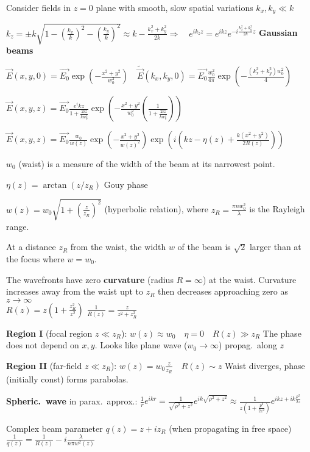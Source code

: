 \begin{squishlist}
    \item Consider fields in $z=0$ plane with smooth, slow spatial variations $k_x, k_y \ll k$
    \item $k_z = \pm k \sqrt{1 - \left(\frac{k_x}{k}\right)^2 - \left(\frac{k_y}{k}\right)^2}\approx k - \tfrac{k_x^2 + k_y^2}{2k} \Rightarrow \quad e^{ik_z z} = e^{ikz}e^{-i \tfrac{k_x^2 + k_y^2}{2k}z}$ \textbf{Gaussian beams}
    \item $\vec{E}(x,y,0) = \vec{E_0} \exp\left({-\tfrac{x^2 + y^2}{w_0^2}}\right) \quad \tilde{\vec{E}}(k_x,k_y,0) = \vec{E_0} \frac{w_0^2}{4\pi} \exp \left(- \frac{(k_x^2 + k_y^2)w_0^2}{4}\right)$
    \item $\vec{E}(x,y,z) = \vec{E_0} \frac{e^ikz}{1 + \tfrac{2iz}{kw_0^2}} \exp\left({-\tfrac{x^2 + y^2}{w_0^2}\left(\tfrac{1}{1 + \tfrac{2iz}{kw_0^2}}\right)}\right)$
    \item $\vec{E}(x,y,z) = \vec{E_0} \frac{w_0}{w(z)}\exp\left(-\frac{x^2 + y^2}{w(z)^2}\right) \exp \left(i \left(kz - \eta(z) + \frac{k(x^2 + y^2)}{2 R(z)}\right)\right)$
    \item $w_0$ (waist) is a measure of the width of the beam at its narrowest point.
    \item $\eta(z) = \arctan (z/z_R)$ Gouy phase
    \item $w(z) = w_0 \sqrt{1 + \left(\frac{z}{z_R}\right)^2}$ (hyperbolic relation), where $z_R = \frac{\pi n w_0^2}{\lambda}$ is the Rayleigh range.
    \item At a distance $z_R$ from the waist, the width $w$ of the beam is $\sqrt{2}$ larger than at the focus where $w=w_0$.
    \item The wavefronts have zero \textbf{curvature} (radius $R = \infty$) at the waist. Curvature increases away from the waist upt to $z_R$ then decreases approaching zero as $z \rightarrow \infty$ \\
    $R(z) = z \left(1 + \frac{z_R^2}{z^2}\right)$ \qquad$\frac{1}{R(z)} = \frac{z}{z^2 + z^2_R}$

    \item \textbf{Region I} (focal region $z \ll z_R$): $w(z) \approx w_0 \quad \eta=0 \quad R(z) \gg z_R$ \quad The phase does not depend on $x,y$. Looks like plane wave ($w_0 \rightarrow \infty$) propag.\ along $z$
    \item \textbf{Region II} (far-field $z \ll z_R$): $w(z) = w_0 \frac{z}{z_R} \quad R(z) \sim z$ \quad Waist diverges, phase (initially const) forms parabolas.
    \item \textbf{Spheric.\ wave} in parax.\ approx.: $\frac{1}{r}e^{ikr} = \frac{1}{\sqrt{\rho^2 + z^2}}e^{ik \sqrt{\rho^2 + z^2}} \approx \frac{1}{z \left(1 + \frac{p^2}{2z^2}\right)}e^{ikz+ik\frac{\rho^2}{2z}}$
    \item Complex beam parameter $q(z) = z + i z_R$ (when propagating in free space) \\ $\frac{1}{q(z)} = \frac{1}{R(z)} - i \frac{\lambda}{n \pi w^2(z)}$
\end{squishlist}

